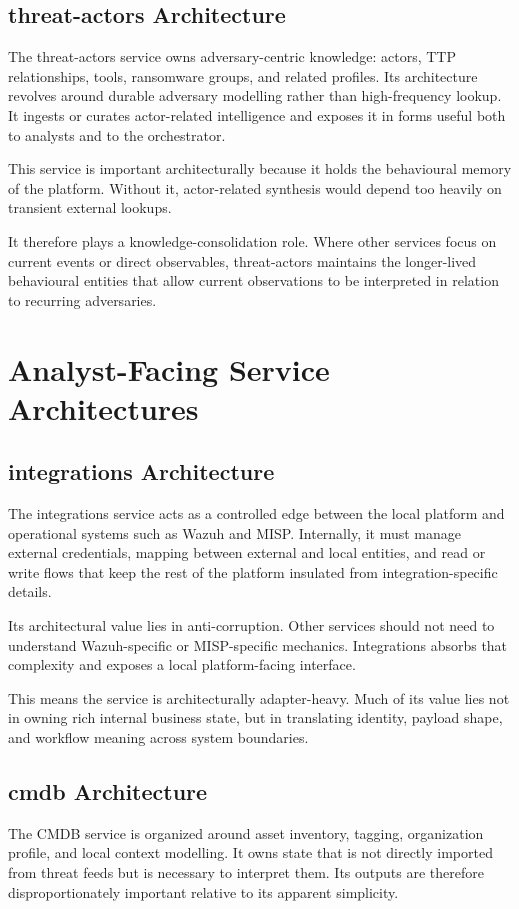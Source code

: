 \subsection{threat-actors Architecture}
The threat-actors service owns adversary-centric knowledge: actors, TTP relationships, tools, ransomware groups, and related profiles. Its architecture revolves around durable adversary modelling rather than high-frequency lookup. It ingests or curates actor-related intelligence and exposes it in forms useful both to analysts and to the orchestrator.

This service is important architecturally because it holds the behavioural memory of the platform. Without it, actor-related synthesis would depend too heavily on transient external lookups.

It therefore plays a knowledge-consolidation role. Where other services focus on current events or direct observables, threat-actors maintains the longer-lived behavioural entities that allow current observations to be interpreted in relation to recurring adversaries.

\section{Analyst-Facing Service Architectures}
\subsection{integrations Architecture}
The integrations service acts as a controlled edge between the local platform and operational systems such as Wazuh and MISP. Internally, it must manage external credentials, mapping between external and local entities, and read or write flows that keep the rest of the platform insulated from integration-specific details.

Its architectural value lies in anti-corruption. Other services should not need to understand Wazuh-specific or MISP-specific mechanics. Integrations absorbs that complexity and exposes a local platform-facing interface.

This means the service is architecturally adapter-heavy. Much of its value lies not in owning rich internal business state, but in translating identity, payload shape, and workflow meaning across system boundaries.

\subsection{cmdb Architecture}
The CMDB service is organized around asset inventory, tagging, organization profile, and local context modelling. It owns state that is not directly imported from threat feeds but is necessary to interpret them. Its outputs are therefore disproportionately important relative to its apparent simplicity.

